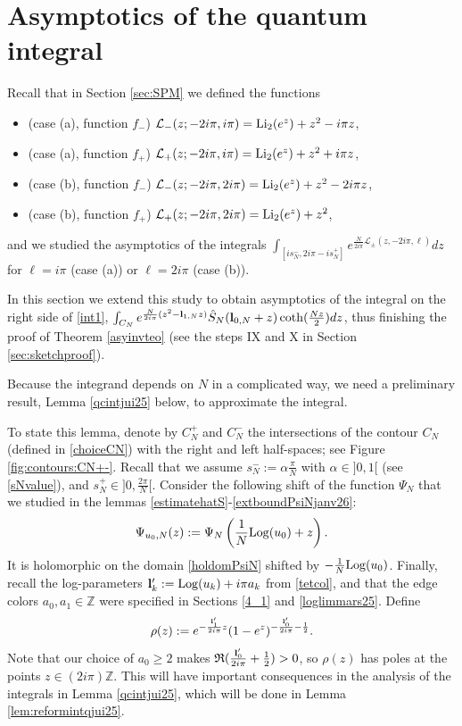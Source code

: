 \documentclass[11pt]{amsart}
\newcommand{\mz}{\mathbb{Z}}
\newcommand{\bl}{{\bf l}}
\newcommand{\Log}{{\rm Log}}
\begin{document}
{\section{Asymptotics of the quantum integral}\label{sec:rect:contour}

Recall that in Section \ref{sec:SPM} we defined the functions
\begin{itemize}
\item (case (a), function $f_-$) $\mathcal{L}_-(z;-2i\pi,i\pi) = {\rm Li}_2(e^{z})+z^2 - i\pi z$,
\item (case (a), function $f_+$)  $\mathcal{L}_+(z;-2i\pi,i\pi) = {\rm Li}_2(e^{z})+z^2 +i\pi  z$,
\item (case (b), function $f_-$) $\mathcal{L}_-(z;-2i\pi,2i\pi) = {\rm Li}_2(e^{z})+z^2 - 2i\pi z$,
\item (case (b), function $f_+$) $ \mathcal{L}_+(z;-2i\pi,2i\pi) = {\rm Li}_2(e^{z})+z^2$,
\end{itemize}
and we studied the asymptotics of the integrals $\textstyle \int_{[is_N^-,2i\pi-is_N^+]} e^{\frac{N}{2i\pi} \mathcal{L}_{\pm}(z,-2i\pi,\ell)}dz$ for $\ell=i\pi$ (case (a)) or $\ell=2i\pi$ (case (b)).

In this section we extend this study to obtain asymptotics of the integral on the right side of \eqref{int1}, $\textstyle \int_{C_N} e^{\frac{N}{2i\pi}(z^2 - \bl_{1,N}z)}\hat S_N(\bl_{0,N} + z)\textstyle \coth(\frac{Nz}{2}) dz$, thus finishing the proof of Theorem \ref{asyinvteo} (see the steps IX and X in Section \ref{sec:sketchproof}).

Because the integrand depends on $N$ in a complicated way, we need a preliminary result, Lemma \ref{qcintjui25} below, to approximate the integral. 

To state this lemma, denote by $C^+_N$ and $C^-_N$ the intersections of the contour $C_N$ (defined in \eqref{choiceCN}) with the right and left half-spaces; see Figure \ref{fig:contours:CN+-}. Recall that we assume $\textstyle s_N^- := \alpha \frac{\pi}{N}$ with $\alpha\in ]0,1[$ (see \eqref{sNvalue}), and $s_N^+\in ]0,\textstyle \frac{2\pi}{N}[$. Consider the following shift of the function $\Psi_N$ that we studied in the lemmas \ref{estimatehatS}-\ref{extboundPsiNjanv26}: \begin{equation}\label{defPsiu0N}
{\Psi_{u_0,N}(z)} := \Psi_N\left(\frac{1}{N}\Log(u_{0}) +z\right).
\end{equation}
It is holomorphic on the domain \eqref{holdomPsiN} shifted by $\textstyle -\frac{1}{N}\Log(u_{0})$. Finally, recall the log-parameters ${\bf l}_k' := \Log(u_{k}) +i\pi a_k$ from \eqref{tetcol}, and that the edge colors $a_0,a_1\in \mz$ were specified in Sections \ref{4_1} and \ref{loglimmars25}. Define
\begin{equation}\label{defrho0}
\rho(z) := e^{-\frac{{\bf l}_1'}{2i\pi}z}(1-e^{z})^{-\frac{{\bf l}_0'}{2i\pi}-\frac{1}{2}}.
\end{equation}
Note that our choice of $a_0\geq 2$ makes $\textstyle \mathfrak{R}(\frac{{\bf l}_0'}{2i\pi}+\frac{1}{2}) >0$, so $\rho(z)$ has poles at the points $z\in (2i\pi)\mz$. This will have important consequences in the analysis of the integrals in Lemma \ref{qcintjui25}, which will be done in Lemma \ref{lem:reformintqjui25}.

}
\end{document}
